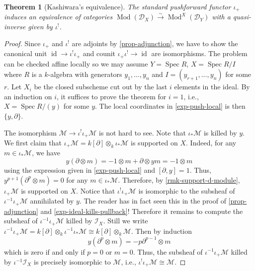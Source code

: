 \documentclass[11pt, a4paper]{article}
\newtheorem{theorem}{Theorem}[subsection]
\theoremstyle{definition}
\newcommand{\Spec}[0]{\operatorname{Spec}}
\newcommand{\id}[0]{\operatorname{id}}
\newcommand{\Mod}{\operatorname{Mod}}
\begin{document}
    \begin{theorem}[Kashiwara's equivalence]
        The standard pushforward functor $\iota_+$ induces an equivalence of categories $\Mod(\mathcal D_X)\xrightarrow{\sim}\Mod^X(\mathcal D_Y)$ with a quasi-inverse given by $\iota^!$.
    \end{theorem}
    \begin{proof}
        Since $\iota_+$ and $\iota^!$ are adjoints by \cref{prop-adjunction}, we have to show the canonical unit $\id\to\iota^!\iota_+$ and counit $\iota_+\iota^!\to\id$ are isomorphisms. The problem can be checked affine locally so we may assume $Y=\Spec R$, $X=\Spec R/I$ where $R$ is a $k$-algebra with generators $y_1,\dots, y_n$ and $I=(y_{r+1},\dots, y_n)$ for some $r$. Let $X_i$ be the closed subscheme cut out by the last $i$ elements in the ideal. By an induction on $i$, it suffices to prove the theorem for $i=1$, i.e., $X=\Spec R/(y)$ for some $y$. The local coordinates in \cref{exp-push-local} is then $\{y, \partial\}$.

        The isomorphism $\mathcal M\to\iota^!\iota_+\mathcal M$ is not hard to see. Note that $\iota_*\mathcal M$ is killed by $y$. We first claim that $\iota_+\mathcal M=k[\partial]\otimes_k\iota_*\mathcal M$ is supported on $X$. Indeed, for any $m\in\iota_*\mathcal M$, we have
        \[y(\partial\otimes m)=-1\otimes m+\partial\otimes ym=-1\otimes m\]
        using the expression given in \cref{exp-push-local} and $[\partial, y]=1$. Thus, $y^{p+1}(\partial^p\otimes m)=0$ for any $m\in\iota_*\mathcal M$. Therefore, by \cref{rmk-support-d-module}, $\iota_+\mathcal M$ is supported on $X$. Notice that $\iota^!\iota_+\mathcal M$ is isomorphic to the subsheaf of $\iota^{-1}\iota_+\mathcal M$ annihilated by $y$. The reader has in fact seen this in the proof of \cref{prop-adjunction} and \cref{exp-ideal-kills-pullback}! Therefore it remains to compute the subsheaf of $\iota^{-1}\iota_+\mathcal M$ killed by $\mathcal I_X$. Still we write $\iota^{-1}\iota_+\mathcal M=k[\partial]\otimes_k\iota^{-1}\iota_*\mathcal M\cong k[\partial]\otimes_k\mathcal M$. Then by induction 
        \[y(\partial^p\otimes m)=-p\partial^{p-1}\otimes m\]
        which is zero if and only if $p=0$ or $m=0$. Thus, the subsheaf of $\iota^{-1}\iota_+\mathcal M$ killed by $\iota^{-1}\mathcal I_X$ is precisely isomorphic to $\mathcal M$, i.e., $\iota^!\iota_+\mathcal M\cong\mathcal M$.


\end{proof}
\end{document}
